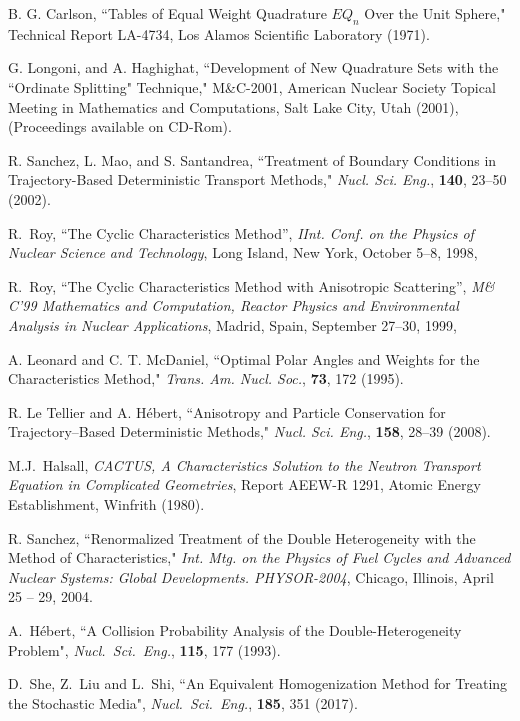 \begin{thebibliography}{99}
B. G. Carlson, ``Tables of Equal Weight Quadrature $EQ_{n}$ Over the Unit Sphere," Technical Report LA-4734, 
Los Alamos Scientific Laboratory (1971).

G. Longoni, and A. Haghighat, ``Development of New Quadrature Sets with the ``Ordinate Splitting" Technique,"
M\&C-2001, American Nuclear Society Topical Meeting in Mathematics and Computations, Salt 
Lake City, Utah (2001), (Proceedings available on CD-Rom). 

R. Sanchez, L. Mao, and S. Santandrea, ``Treatment of Boundary Conditions in Trajectory-Based Deterministic
Transport Methods," {\sl Nucl. Sci. Eng.}, {\bf 140}, 23--50 (2002). 

R.~Roy, 
``The Cyclic Characteristics Method'', 
{\sl IInt. Conf. on the Physics of Nuclear Science and Technology}, 
Long Island, New York, October 5--8, 1998,

R.~Roy, 
``The Cyclic Characteristics Method with Anisotropic Scattering'', 
\textsl{M\& C'99 Mathematics and Computation, Reactor Physics and Environmental Analysis
in Nuclear Applications}, Madrid, Spain, September  27--30, 1999,

A. Leonard and C. T. McDaniel, ``Optimal Polar Angles and Weights for the
Characteristics Method," \textsl{Trans. Am. Nucl. Soc.}, \textbf{73}, 172 (1995).

R. Le Tellier and A. H\'ebert, ``Anisotropy and Particle Conservation for Trajectory--Based 
Deterministic Methods," {\sl Nucl. Sci. Eng.}, {\bf 158}, 28--39 (2008).

M.J.~Halsall, 
\textsl{CACTUS, A Characteristics Solution to the Neutron Transport 
Equation in Complicated Geometries}, 
Report AEEW-R 1291, Atomic Energy Establishment,
Winfrith (1980).

R. Sanchez, ``Renormalized Treatment of the Double Heterogeneity with
the Method of Characteristics,"
{\sl Int. Mtg. on the Physics of Fuel Cycles and Advanced Nuclear Systems:
Global Developments. PHYSOR-2004}, Chicago, Illinois, April 25 -- 29, 2004.

A.~H\'ebert, ``A Collision Probability Analysis of the Double-Heterogeneity
Problem", {\sl Nucl.~Sci.~Eng.}, {\bf 115}, 177 (1993).

D.~She, Z.~Liu and L.~Shi, ``An Equivalent Homogenization Method for Treating the Stochastic Media", 
{\sl Nucl.~Sci.~Eng.}, {\bf 185}, 351 (2017).


\end{thebibliography}
